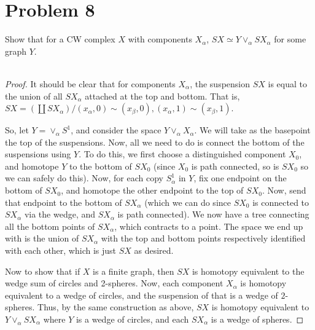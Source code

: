 \documentclass[fontsize=11pt]{scrartcl} %
\numberwithin{equation}{section} %
\numberwithin{figure}{section} %
\numberwithin{table}{section} %
\begin{document}
\section*{Problem 8}
Show that for a CW complex $X$ with components $X_{\alpha}$, $SX\simeq
Y\vee_{\alpha}SX_{\alpha}$ for some graph $Y$.
\\
\\
\begin{proof}
    It should be clear that for components $X_{\alpha}$, the suspension $SX$ is
    equal to the union of all $SX_{\alpha}$ attached at the top and bottom. That
    is, $SX = (\coprod SX_{\alpha})/{(x_\alpha,0)\sim (x_{\beta},0),
    (x_{\alpha},1)\sim (x_{\beta},1)}$.

    So, let $Y = \vee_{\alpha}S^1$, and consider the space
    $Y\vee_{\alpha}X_{\alpha}$. We will take as the basepoint the top of the
    suspensions. Now, all we need to do is connect the bottom of the suspensions
    using $Y$. To do this, we first choose a distinguished component $X_0$, and
    homotope $Y$ to the bottom of $SX_0$ (since $X_0$ is path connected, so is
    $SX_0$ so we can safely do this). Now, for each copy $S^1_{\alpha}$ in $Y$,
    fix one endpoint on the bottom of $SX_0$, and homotope the other endpoint
    to the top of $SX_0$. Now, send that endpoint to the bottom of $SX_{\alpha}$
    (which we can do since $SX_0$ is connected to $SX_{\alpha}$ via the wedge,
    and $SX_{\alpha}$ is path connected). We now have a tree connecting all the
    bottom points of $SX_{\alpha}$, which contracts to a point. The space we end
    up with is the union of $SX_{\alpha}$ with the top and bottom points
    respectively identified with each other, which is just $SX$ as desired.

    Now to show that if $X$ is a finite graph, then $SX$ is homotopy equivalent
    to the wedge sum of circles and 2-spheres. Now, each component $X_{\alpha}$
    is homotopy equivalent to a wedge of circles, and the suspension of that is
    a wedge of $2$-spheres. Thus, by the same construction as above, $SX$ is
    homotopy equivalent to $Y\vee_{\alpha}SX_{\alpha}$ where $Y$ is a wedge of
    circles, and each $SX_{\alpha}$ is a wedge of spheres.
\end{proof}
\end{document}
